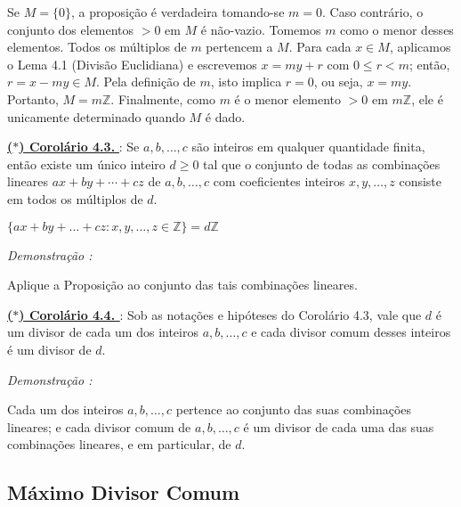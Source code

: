             Se $M = \{0\}$, a proposição é verdadeira tomando-se $m = 0$. Caso contrário, o conjunto dos elementos
            $> 0$ em $M$ é não-vazio. Tomemos $m$ como o menor desses elementos. Todos os múltiplos de $m$ pertencem
            a $M$. Para cada $x \in M$, aplicamos o Lema 4.1 (Divisão Euclidiana) e escrevemos $x = my + r$ com
            $0 \le r < m$; então, $r = x - my \in M$. Pela definição de $m$, isto implica $r = 0$, ou seja, $x = my$. Portanto,
            $M = m\mathbb{Z}$. Finalmente, como $m$ é o menor elemento $> 0$ em $m\mathbb{Z}$, ele é unicamente determinado quando
            $M$ é dado.

        \underline{\underline{ \textbf{\textcolor{cinzaEscuro}{($\ast$) Corolário 4.3.}} }} : Se $a, b, \ldots, c$ são inteiros em qualquer quantidade finita, 
        então existe um único inteiro $d \ge 0$ tal que o conjunto de todas as combinações lineares $ax + by + \cdots + cz$ de 
        $a, b, \ldots, c$ com coeficientes inteiros $x, y, \ldots, z$ consiste em todos os múltiplos de $d$.

        \begin{center}
            $ \{ax + by + \ldots + cz : x,y,\ldots,z \in \mathbb{Z} \} = d\mathbb{Z} $
        \end{center}

        \textit{Demonstração : }

        Aplique a Proposição ao conjunto das tais combinações lineares.

        \underline{\underline{ \textbf{\textcolor{cinzaEscuro}{($\ast$) Corolário 4.4. }} }} : Sob as notações e hipóteses do Corolário 4.3, vale que $d$ é um 
        divisor de cada um dos inteiros $a, b, \ldots, c$ e cada divisor comum desses inteiros é um divisor de $d$.

        \vspace{2cm}
        \textit{Demonstração : }

        Cada um dos inteiros $a, b, \ldots, c$ pertence ao conjunto das suas combinações lineares; e cada divisor comum de 
        $a, b, \ldots, c$ é um divisor de cada uma das suas combinações lineares, e em particular, de $d$.

    \subsection{Máximo Divisor Comum}

